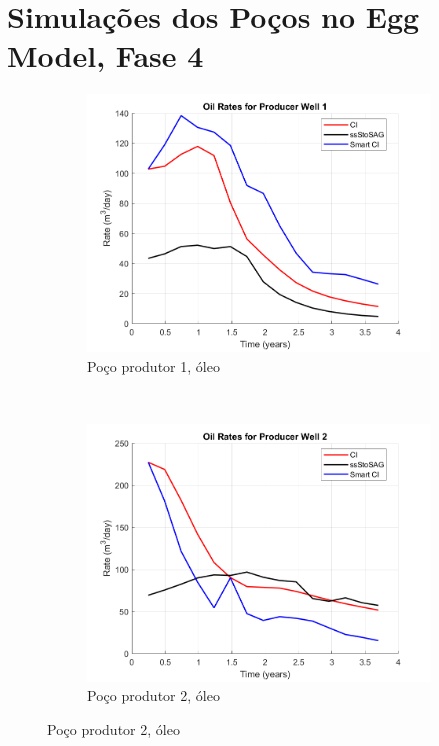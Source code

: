 \chapter{Simula\c{c}\~{o}es dos Po\c{c}os no Egg Model, Fase 4}\label{apn:egg4}

\begin{figure}[!ht]
	\centering
	\begin{subfigure}[b]{.45\textwidth}
		\includegraphics[width=\textwidth]{figs/resultadosEgg/imgsim4/EGG_OilWell1_Zoom}
		\caption{Po\c{c}o produtor 1, \'{o}leo}
		\label{EGG4_OilWell1}
	\end{subfigure}
	~
	\begin{subfigure}[b]{.45\textwidth}
		\includegraphics[width=\textwidth]{figs/resultadosEgg/imgsim4/EGG_OilWell2_Zoom}
		\caption{Po\c{c}o produtor 2, \'{o}leo}
		\label{EGG4_OilWell2}
	\end{subfigure}
	

\end{figure}
